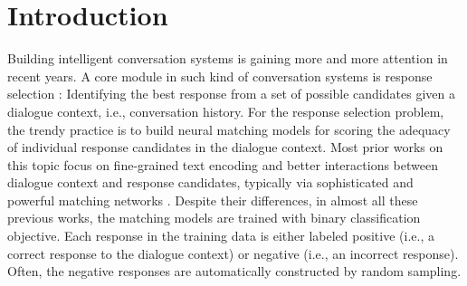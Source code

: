 \documentclass[11pt,a4paper]{article}
\begin{document}
	\section{Introduction}
	Building intelligent conversation systems \cite{shum2018eliza, kollar2018alexa} is gaining more and more attention in recent years. A core module in such kind of conversation systems is response selection \cite{ritter2011data,hu2014convolutional,wu2017sequential,tao2019one}: Identifying the best response from a set of possible candidates given a dialogue context, i.e., conversation history. For the response selection problem, the trendy practice is to build neural matching models \cite{ji2014information,wang2015syntax,xu2016incorporating,wu2017sequential,zhou2018multi,lu2019constructing} for scoring the adequacy of individual response candidates in the dialogue context. Most prior works on this topic focus on fine-grained
	text encoding and better interactions between dialogue context and response candidates, typically via sophisticated and powerful matching networks \cite{wu2017sequential,zhou2018multi,lu2019constructing,gu2019interactive}. Despite their differences, in almost all these previous works, the matching models are trained with binary classification objective. Each response in the training data is either labeled positive (i.e., a correct response to the dialogue context) or negative (i.e., an incorrect response). Often, the negative responses are automatically constructed by random sampling.
\end{document}
